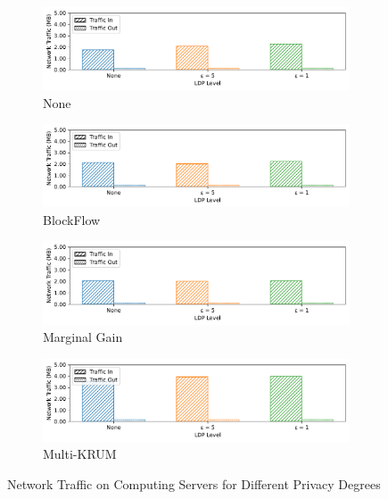 \begin{figure}[!ht]
    \centering
    \begin{subfigure}[b]{0.49\textwidth}
        \centering
        \includegraphics[width=\textwidth]{graphics/05_priv_net_none_server.pdf}
        \caption{None}
    \end{subfigure}
    \hfill
    \begin{subfigure}[b]{0.49\textwidth}
        \centering
        \includegraphics[width=\textwidth]{graphics/05_priv_net_blockflow_server.pdf}
        \caption{BlockFlow}
    \end{subfigure}
    \hfill
    \begin{subfigure}[b]{0.49\textwidth}
        \centering
        \includegraphics[width=\textwidth]{graphics/05_priv_net_marginalgain_server.pdf}
        \caption{Marginal Gain}
    \end{subfigure}
    \hfill
    \begin{subfigure}[b]{0.49\textwidth}
        \centering
        \includegraphics[width=\textwidth]{graphics/05_priv_net_multikrum_server.pdf}
        \caption{Multi-KRUM}
    \end{subfigure}
    \caption{Network Traffic on Computing Servers for Different Privacy Degrees}
    \label{fig:net_priv_degree_server}
\end{figure}

